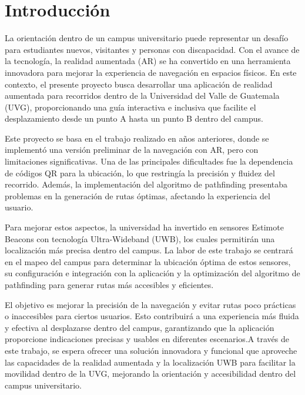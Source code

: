 \documentclass{article}
\begin{document}
\section{Introducción}
{\justify
La orientación dentro de un campus universitario puede representar un desafío para estudiantes nuevos, visitantes y personas con
 discapacidad. Con el avance de la tecnología, la realidad aumentada (AR) se ha convertido en una herramienta innovadora para mejorar
  la experiencia de navegación en espacios físicos. En este contexto, el presente proyecto busca desarrollar una aplicación de realidad
   aumentada para recorridos dentro de la Universidad del Valle de Guatemala (UVG), proporcionando una guía interactiva e inclusiva 
   que facilite el desplazamiento desde un punto A hasta un punto B dentro del campus.

Este proyecto se basa en el trabajo realizado en años anteriores, donde se implementó una versión preliminar de la navegación con AR,
 pero con limitaciones significativas. Una de las principales dificultades fue la dependencia de códigos QR para la ubicación, lo que
  restringía la precisión y fluidez del recorrido. Además, la implementación del algoritmo de pathfinding presentaba problemas en la 
  generación de rutas óptimas, afectando la experiencia del usuario.

Para mejorar estos aspectos, la universidad ha invertido en sensores Estimote Beacons con tecnología Ultra-Wideband (UWB), los cuales
 permitirán una localización más precisa dentro del campus. La labor de este trabajo se centrará en el mapeo del campus para 
 determinar la ubicación óptima de estos sensores, su configuración e integración con la aplicación y la optimización del algoritmo
  de pathfinding para generar rutas más accesibles y eficientes.

El objetivo es mejorar la precisión de la navegación y evitar rutas poco prácticas o inaccesibles para ciertos usuarios. Esto 
contribuirá a una experiencia más fluida y efectiva al desplazarse dentro del campus, garantizando que la aplicación proporcione 
indicaciones precisas y usables en diferentes escenarios.A través de este trabajo, se espera ofrecer una solución innovadora y 
funcional que aproveche las capacidades de la realidad aumentada y la localización UWB para facilitar la movilidad dentro de la UVG,
 mejorando la orientación y accesibilidad dentro del campus universitario.}
\end{document}
